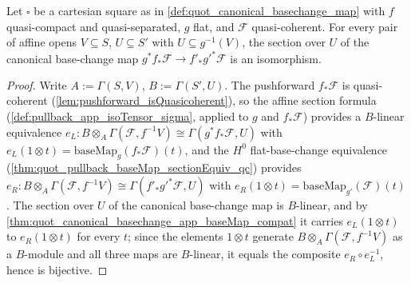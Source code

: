 \begin{theorem}
  \label{thm:quot_canonical_basechange_app_app_isIso_of_le_preimage}
  \leanok
  Let \(\square\) be a cartesian square as in
  \cref{def:quot_canonical_basechange_map} with \(f\) quasi-compact and
  quasi-separated, \(g\) flat, and \(\mathcal F\) quasi-coherent. For every
  pair of affine opens \(V \subseteq S\), \(U \subseteq S'\) with
  \(U \subseteq g^{-1}(V)\), the section over \(U\) of the canonical
  base-change map \(g^* f_* \mathcal F \to f'_* g'^* \mathcal F\) is an
  isomorphism.
\end{theorem}
\begin{proof}\leanok
  Write \(A := \Gamma(S, V)\), \(B := \Gamma(S', U)\). The pushforward
  \(f_* \mathcal F\) is quasi-coherent
  (\cref{lem:pushforward_isQuasicoherent}), so the affine section formula
  (\cref{def:pullback_app_isoTensor_sigma}, applied to \(g\) and
  \(f_*\mathcal F\)) provides a \(B\)-linear equivalence
  \(e_L : B \otimes_A \Gamma(\mathcal F, f^{-1}V) \cong
    \Gamma(g^* f_* \mathcal F, U)\) with
  \(e_L(1 \otimes t) = \mathrm{baseMap}_{g}(f_*\mathcal F)(t)\), and the
  \(H^0\) flat-base-change equivalence
  (\cref{thm:quot_pullback_baseMap_sectionEquiv_qc}) provides
  \(e_R : B \otimes_A \Gamma(\mathcal F, f^{-1}V) \cong
    \Gamma(f'_* g'^* \mathcal F, U)\) with
  \(e_R(1 \otimes t) = \mathrm{baseMap}_{g'}(\mathcal F)(t)\).
  The section over \(U\) of the canonical base-change map is
  \(B\)-linear, and by
  \cref{thm:quot_canonical_basechange_app_baseMap_compat} it carries
  \(e_L(1 \otimes t)\) to \(e_R(1 \otimes t)\) for every \(t\); since the
  elements \(1 \otimes t\) generate
  \(B \otimes_A \Gamma(\mathcal F, f^{-1}V)\) as a \(B\)-module and all
  three maps are \(B\)-linear, it equals the composite
  \(e_R \circ e_L^{-1}\), hence is bijective.
\end{proof}

